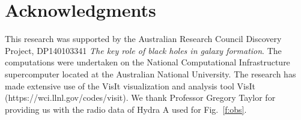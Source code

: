 \documentclass[useAMS, usenatbib]{mn2e}
\begin{document}

 



\section*{Acknowledgments}

This research was supported by the Australian Research Council Discovery Project, DP140103341 \emph{The key role of black holes in galaxy formation}.  The computations were undertaken on the National Computational Infrastructure supercomputer located at the Australian National University. The research has made extensive use of the VisIt visualization and analysis tool VisIt (https://wci.llnl.gov/codes/visit). We thank Professor Gregory Taylor for providing us with the radio data of Hydra A used for Fig.~\ref{f:obs}.







%
%
\appendix
\end{document}
